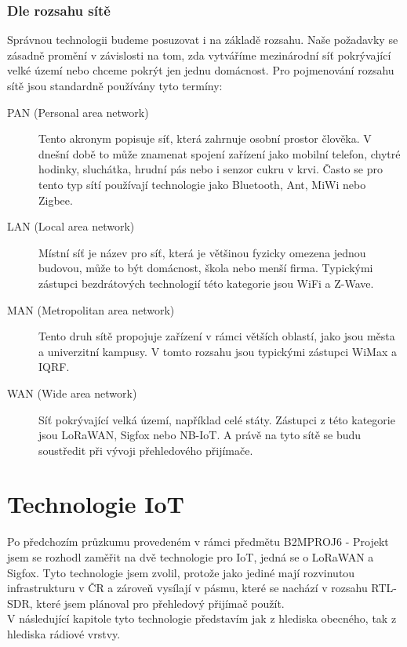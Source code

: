 \documentclass{ctuthesis}
\begin{document}
\subsection{Dle rozsahu sítě}
Správnou technologii budeme posuzovat i na základě rozsahu. Naše požadavky se zásadně promění v závislosti na tom, zda vytváříme mezinárodní síť pokrývající velké území nebo chceme pokrýt jen jednu domácnost. Pro pojmenování rozsahu sítě jsou standardně používány tyto termíny:
\begin{description}
\item [PAN (Personal area network)]
Tento akronym popisuje síť, která zahrnuje osobní prostor člověka. V dnešní době to může znamenat spojení zařízení jako mobilní telefon, chytré hodinky, sluchátka, hrudní pás nebo i senzor cukru v krvi. Často se pro tento typ sítí používají technologie jako Bluetooth, Ant, MiWi nebo Zigbee.

\item [LAN (Local area network)]
Místní síť je název pro síť, která je většinou fyzicky omezena jednou budovou, může to být domácnost, škola nebo menší firma. Typickými zástupci bezdrátových technologií této kategorie jsou WiFi a Z-Wave.

\item [MAN (Metropolitan area network)]
Tento druh sítě propojuje zařízení v rámci větších oblastí, jako jsou města a univerzitní kampusy. V tomto rozsahu jsou typickými zástupci WiMax a IQRF.

\item [WAN (Wide area network)]
Síť pokrývající velká území, například celé státy. Zástupci z této kategorie jsou LoRaWAN, Sigfox nebo NB-IoT. A právě na tyto sítě se budu soustředit při vývoji přehledového přijímače.
\end{description}
\cite{ja}

\chapter{Technologie IoT}
Po předchozím průzkumu provedeném v rámci předmětu B2MPROJ6 - Projekt jsem se rozhodl zaměřit na dvě technologie pro IoT, jedná se o LoRaWAN a Sigfox. Tyto technologie jsem zvolil, protože jako jediné mají rozvinutou infrastrukturu v ČR a zároveň vysílají v pásmu, které se nachází v rozsahu RTL-SDR, které jsem plánoval pro přehledový přijímač použít.\\
V následující kapitole tyto technologie představím jak z hlediska obecného, tak z hlediska rádiové vrstvy.
\end{document}
